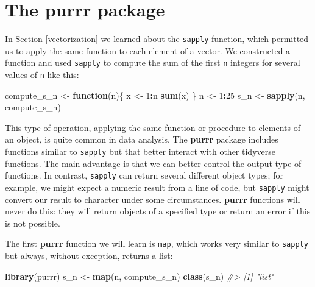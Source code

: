 \documentclass[
]{krantz}
\newenvironment{Shaded}{\begin{snugshade}}{\end{snugshade}}
\newcommand{\CommentTok}[1]{\textcolor[rgb]{0.37,0.37,0.37}{\textit{#1}}}
\newcommand{\ControlFlowTok}[1]{\textcolor[rgb]{0.27,0.27,0.27}{\textbf{#1}}}
\newcommand{\DecValTok}[1]{\textcolor[rgb]{0.06,0.06,0.06}{#1}}
\newcommand{\KeywordTok}[1]{\textcolor[rgb]{0.27,0.27,0.27}{\textbf{#1}}}
\newcommand{\NormalTok}[1]{#1}
\newcommand{\OperatorTok}[1]{\textcolor[rgb]{0.43,0.43,0.43}{\textbf{#1}}}
\newcommand{\StringTok}[1]{\textcolor[rgb]{0.5,0.5,0.5}{#1}}
\begin{document}
\hypertarget{the-purrr-package}{%
\section{\texorpdfstring{The \textbf{purrr} package}{The purrr package}}\label{the-purrr-package}}

In Section \ref{vectorization} we learned about the \texttt{sapply} function, which permitted us to apply the same function to each element of a vector. We constructed a function and used \texttt{sapply} to compute the sum of the first \texttt{n} integers for several values of \texttt{n} like this:

\begin{Shaded}
\begin{Highlighting}[]
\NormalTok{compute_s_n <-}\StringTok{ }\ControlFlowTok{function}\NormalTok{(n)\{}
\NormalTok{  x <-}\StringTok{ }\DecValTok{1}\OperatorTok{:}\NormalTok{n}
  \KeywordTok{sum}\NormalTok{(x)}
\NormalTok{\}}
\NormalTok{n <-}\StringTok{ }\DecValTok{1}\OperatorTok{:}\DecValTok{25}
\NormalTok{s_n <-}\StringTok{ }\KeywordTok{sapply}\NormalTok{(n, compute_s_n)}
\end{Highlighting}
\end{Shaded}

This type of operation, applying the same function or procedure to elements of an object, is quite common in data analysis. The \textbf{purrr} package includes functions similar to \texttt{sapply} but that better interact with other tidyverse functions. The main advantage is that we can better control the output type of functions. In contrast, \texttt{sapply} can return several different object types; for example, we might expect a numeric result from a line of code, but \texttt{sapply} might convert our result to character under some circumstances. \textbf{purrr} functions will never do this: they will return objects of a specified type or return an error if this is not possible.

The first \textbf{purrr} function we will learn is \texttt{map}, which works very similar to \texttt{sapply} but always, without exception, returns a list:

\begin{Shaded}
\begin{Highlighting}[]
\KeywordTok{library}\NormalTok{(purrr)}
\NormalTok{s_n <-}\StringTok{ }\KeywordTok{map}\NormalTok{(n, compute_s_n)}
\KeywordTok{class}\NormalTok{(s_n)}
\CommentTok{#> [1] "list"}
\end{Highlighting}
\end{Shaded}
\end{document}
